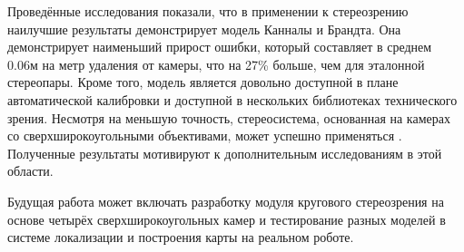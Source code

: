 Проведённые исследования показали, что в применении к стереозрению наилучшие результаты демонстрирует модель Канналы и Брандта. Она демонстрирует наименьший 
прирост ошибки, который составляет в среднем 0.06м на метр удаления от камеры, что на 27\% больше, чем для эталонной стереопары. Кроме того, модель является довольно доступной 
в плане автоматической калибровки и доступной в нескольких библиотеках технического зрения. Несмотря на меньшую точность, 
стереосистема, основанная на камерах со сверхширокоугольными объективами, может успешно применяться \cite{}. Полученные результаты мотивируют к дополнительным 
исследованиям в этой области.

Будущая работа может включать разработку модуля кругового стереозрения на основе четырёх сверхширокоугольных камер и тестирование разных моделей в 
системе локализации и построения карты на реальном роботе. 


\newpage




